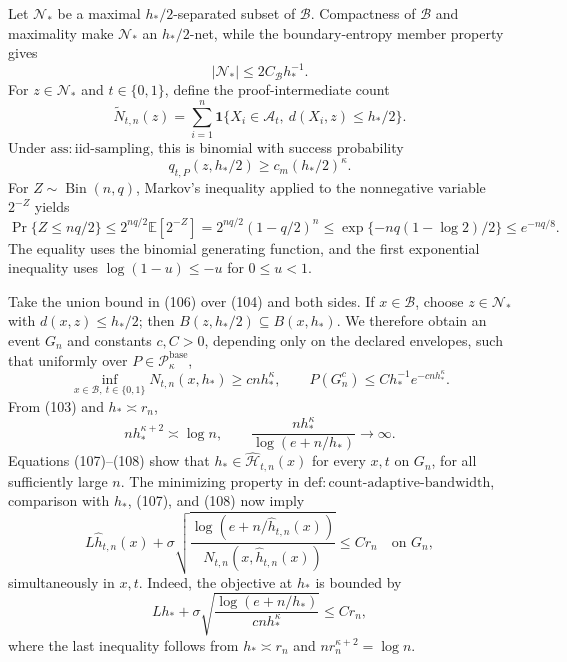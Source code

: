 Let \(\mathcal N_*\) be a maximal \(h_*/2\)-separated subset of \(\mathcal B\). Compactness of \(\mathcal B\) and maximality make \(\mathcal N_*\) an \(h_*/2\)-net, while the boundary-entropy member property gives
\[
 |\mathcal N_*|\le 2C_{\mathcal B}h_*^{-1}. \tag{104}
\]
For \(z\in\mathcal N_*\) and \(t\in\{0,1\}\), define the proof-intermediate count
\[
 \widetilde N_{t,n}(z)=\sum_{i=1}^n
 \mathbf 1\{X_i\in\mathcal A_t,\ d(X_i,z)\le h_*/2\}.
\]
Under \(\mathrm{ass:iid\text{-}sampling}\), this is binomial with success probability
\[
 q_{t,P}(z,h_*/2)\ge c_m(h_*/2)^\kappa. \tag{105}
\]
For \(Z\sim\operatorname{Bin}(n,q)\), Markov's inequality applied to the nonnegative variable \(2^{-Z}\) yields
\[
 \Pr\{Z\le nq/2\}
 \le 2^{nq/2}\mathbb E[2^{-Z}]
 =2^{nq/2}(1-q/2)^n
 \le \exp\{-nq(1-\log2)/2\}\le e^{-nq/8}. \tag{106}
\]
The equality uses the binomial generating function, and the first exponential inequality uses \(\log(1-u)\le-u\) for \(0\le u<1\).

Take the union bound in (106) over (104) and both sides. If \(x\in\mathcal B\), choose \(z\in\mathcal N_*\) with \(d(x,z)\le h_*/2\); then \(B(z,h_*/2)\subseteq B(x,h_*)\). We therefore obtain an event \(G_n\) and constants \(c,C>0\), depending only on the declared envelopes, such that uniformly over \(P\in\mathcal P_\kappa^{\mathrm{base}}\),
\[
 \inf_{x\in\mathcal B,\ t\in\{0,1\}}N_{t,n}(x,h_*)\ge cnh_*^\kappa,
 \qquad
 P(G_n^c)\le Ch_*^{-1}e^{-cnh_*^\kappa}. \tag{107}
\]
From (103) and \(h_*\asymp r_n\),
\[
 nh_*^{\kappa+2}\asymp\log n,
 \qquad
 \frac{nh_*^\kappa}{\log(e+n/h_*)}\longrightarrow\infty. \tag{108}
\]
Equations (107)--(108) show that \(h_*\in\widehat{\mathcal H}_{t,n}(x)\) for every \(x,t\) on \(G_n\), for all sufficiently large \(n\). The minimizing property in \(\mathrm{def:count\text{-}adaptive\text{-}bandwidth}\), comparison with \(h_*\), (107), and (108) now imply
\[
 L\widehat h_{t,n}(x)+\sigma\sqrt{\frac{\log(e+n/\widehat h_{t,n}(x))}
 {N_{t,n}(x,\widehat h_{t,n}(x))}}\le C r_n \quad\text{on }G_n, \tag{109}
\]
simultaneously in \(x,t\). Indeed, the objective at \(h_*\) is bounded by
\[
 Lh_*+\sigma\sqrt{\frac{\log(e+n/h_*)}{cnh_*^\kappa}}\le C r_n, \tag{110}
\]
where the last inequality follows from \(h_*\asymp r_n\) and \(nr_n^{\kappa+2}=\log n\).

